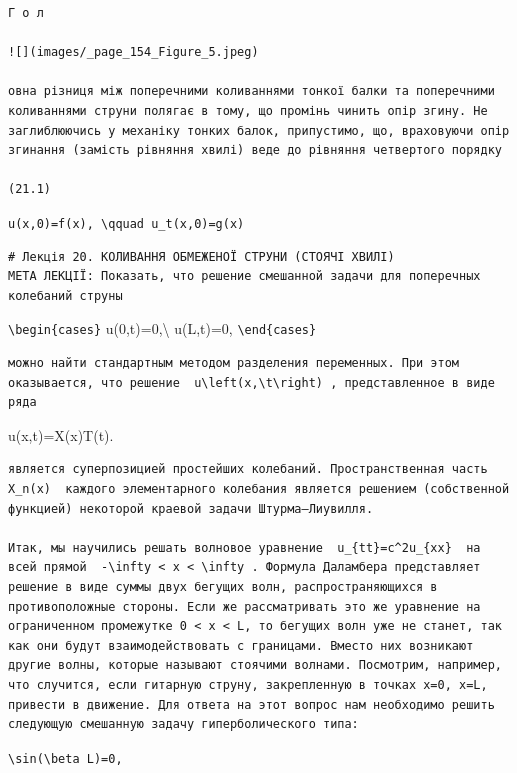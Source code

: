 \documentclass[
  ukrainian,
]{article}
\begin{document}
\begin{verbatim}
Г о л

![](images/_page_154_Figure_5.jpeg)

овна різниця між поперечними коливаннями тонкої балки та поперечними коливаннями струни полягає в тому, що промінь чинить опір згину. Не заглиблюючись у механіку тонких балок, припустимо, що, враховуючи опір згинання (замість рівняння хвилі) веде до рівняння четвертого порядку

(21.1)
\end{verbatim}

\texttt{u(x,0)=f(x),\ \textbackslash{}qquad\ u\_t(x,0)=g(x)}

\begin{verbatim}
# Лекція 20. КОЛИВАННЯ ОБМЕЖЕНОЇ СТРУНИ (СТОЯЧІ ХВИЛІ)
МЕТА ЛЕКЦІЇ: Показать, что решение смешанной задачи для поперечных колебаний струны
\end{verbatim}

\texttt{\textbackslash{}begin\{cases\}} u(0,t)=0,\textbackslash{}
u(L,t)=0, \texttt{\textbackslash{}end\{cases\}}

\begin{verbatim}
можно найти стандартным методом разделения переменных. При этом оказывается, что решение  u\left(x,\t\right) , представленное в виде ряда
\end{verbatim}

u(x,t)=X(x)T(t).

\begin{verbatim}
является суперпозицией простейших колебаний. Пространственная часть  X_n(x)  каждого элементарного колебания является решением (собственной функцией) некоторой краевой задачи Штурма—Лиувилля.

Итак, мы научились решать волновое уравнение  u_{tt}=c^2u_{xx}  на всей прямой  -\infty < x < \infty . Формула Даламбера представляет решение в виде суммы двух бегущих волн, распространяющихся в противоположные стороны. Если же рассматривать это же уравнение на ограниченном промежутке 0 < x < L, то бегущих волн уже не станет, так как они будут взаимодействовать с границами. Вместо них возникают другие волны, которые называют стоячими волнами. Посмотрим, например, что случится, если гитарную струну, закрепленную в точках x=0, x=L, привести в движение. Для ответа на этот вопрос нам необходимо решить следующую смешанную задачу гиперболического типа:
\end{verbatim}

\texttt{\textbackslash{}sin(\textbackslash{}beta\ L)=0,}
\end{document}
